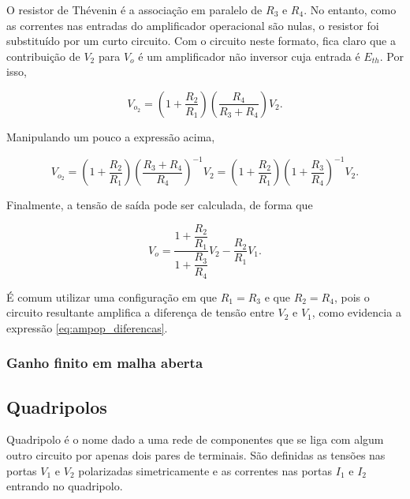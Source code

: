 \documentclass{article}
\numberwithin{equation}{section}
\let\l\left
\let\r\right
\let\dfr\dfrac
\begin{document}
\begin{center}
\end{center}

\noindent O resistor de Thévenin é a associação em paralelo de $R_3$ e $R_4$. No entanto, como as correntes nas entradas do amplificador operacional são nulas, o resistor foi substituído por um curto circuito. Com o circuito neste formato, fica claro que a contribuição de $V_2$ para $V_o$ é um amplificador não inversor cuja entrada é $E_{th}$. Por isso,

\begin{equation}
    V_{o_2} = \l(1+\dfr{R_2}{R_1}\r) \l(\dfr{R_4}{R_3+R_4}\r) V_2.
\end{equation}

\noindent Manipulando um pouco a expressão acima,

\begin{equation}
    V_{o_2} = \l(1+\dfr{R_2}{R_1}\r) \l(\dfr{R_3+R_4}{R_4}\r)^{-1} V_2 = \l(1+\dfr{R_2}{R_1}\r) \l(1+\dfr{R_3}{R_4}\r)^{-1} V_2.
\end{equation}

\noindent Finalmente, a tensão de saída pode ser calculada, de forma que

\begin{equation}
    V_o = \dfr{1+\dfr{R_2}{R_1}}{1+\dfr{R_3}{R_4}}V_2 - \dfr{R_2}{R_1}V_1.
\end{equation}

\noindent É comum utilizar uma configuração em que $R_1=R_3$ e que $R_2=R_4$, pois o circuito resultante amplifica a diferença de tensão entre $V_2$ e $V_1$, como evidencia a expressão \eqref{eq:ampop_diferencas}.

\subsubsection{Ganho finito em malha aberta}
\label{subsubsec:ganho finito}

\subsection{Quadripolos}
\label{subsec:quadripolos}
Quadripolo é o nome dado a uma rede de componentes que se liga com algum outro circuito por apenas dois pares de terminais. São definidas as tensões nas portas $V_{1}$ e $V_{2}$ polarizadas simetricamente e as correntes nas portas $I_{1}$ e $I_{2}$ entrando no quadripolo.
\end{document}
